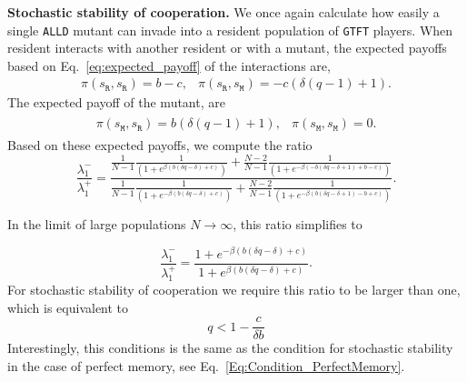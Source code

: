 \documentclass[11pt]{article}
\def\alld{\texttt{ALLD}}
\def\gtft{\texttt{GTFT}}
\def\resident{\texttt{R}}
\def\mutant{\texttt{M}}
\def\strategy{s}
\theoremstyle{plainCl1}
\theoremstyle{plainCl2}
\begin{document}
\noindent
{\bf Stochastic stability of cooperation.}
We once again calculate how easily a single \alld{} mutant can invade into a
resident population of \gtft{} players. When resident interacts with another
resident or with a mutant,
the expected payoffs based on Eq.~\eqref{eq:expected_payoff} of the interactions are,
\begin{equation*}
\begin{array}{ll}
  \pi (\strategy_\resident, \strategy_\resident) =  b - c,
  &\pi (\strategy_\resident, \strategy_\mutant) =  - c \left(\delta \left(q - 1\right) + 1\right).
\end{array}
\end{equation*}
The expected payoff of the mutant, are
\begin{align*}
\begin{array}{ll}
  \pi (\strategy_\mutant, \strategy_\resident) =  b \left(\delta \left(q - 1\right) + 1\right),
  &\pi (\strategy_\mutant, \strategy_\mutant) =  0.
\end{array}
\end{align*}
Based on these expected payoffs, we compute the ratio
\begin{equation}
  \frac{\lambda^{-}_1}{\lambda^{+}_1} =
  \frac{\frac{1}{N-1}\frac{1}{\left(1 + e^{\beta \left(b \left(\delta q - \delta\right) + c\right)}\right)}
  + \frac{N - 2}{N-1}\frac{1}{\left(1 + e^{- \beta \left(- b \left(\delta q - \delta + 1\right) + b - c\right)}\right)}}
  {\frac{1}{N-1}\frac{1}{\left(1 + e^{- \beta \left(b \left(\delta q - \delta\right) + c\right)}\right)}
  + \frac{N - 2}{N-1}\frac{1}{\left(1 + e^{- \beta \left(b \left(\delta q - \delta + 1\right) - b + c\right)}\right)}}.
\end{equation}

\noindent
In the limit of large populations \(N \rightarrow \infty \), this ratio simplifies to

\begin{equation}
  \frac{\lambda^{-}_1}{\lambda^{+}_1} =
  \frac{1 + e^{- \beta \left(b \left(\delta q - \delta\right) + c\right)}}{1 + e^{\beta \left(b \left(\delta q - \delta\right) + c\right)}}.
\end{equation}
For stochastic stability of cooperation we require this ratio to be larger than one, which is equivalent to
\begin{equation} \label{Eq:Condition_OneInteractionExpectedPayoff}
  q<1 - \frac{c}{\delta b}
\end{equation}
Interestingly, this conditions is the same as the condition for stochastic
stability in the case of perfect memory, see
Eq.~\eqref{Eq:Condition_PerfectMemory}.
\end{document}
